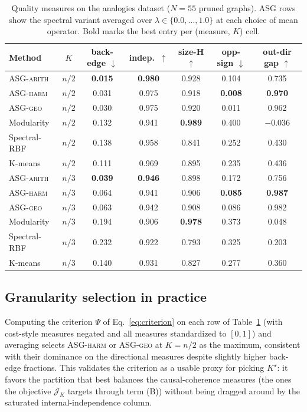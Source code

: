 \documentclass[table, 11pt]{article}
\begin{document}
\begin{table}[t]
\centering
\caption{Quality measures on the analogies dataset ($N=55$ pruned
graphs). ASG rows show the spectral variant averaged over
$\lambda \in \{0.0, \ldots, 1.0\}$ at each choice of mean operator.
Bold marks the best entry per (measure, $K$) cell.}
\label{tab:main}
\small
\begin{tabular}{@{}lcccccc@{}}
\toprule
\textbf{Method} & $K$ & back-edge $\downarrow$ & indep.\ $\uparrow$ & size-H $\uparrow$ & opp-sign $\downarrow$ & out-dir gap $\uparrow$ \\
\midrule
\textsc{ASG-arith} & $n/2$ & \textbf{0.015} & \textbf{0.980} & 0.928 & 0.104 & 0.735 \\
\textsc{ASG-harm}  & $n/2$ & 0.031 & 0.975 & 0.918 & \textbf{0.008} & \textbf{0.970} \\
\textsc{ASG-geo}   & $n/2$ & 0.030 & 0.975 & 0.920 & 0.011 & 0.962 \\
Modularity         & $n/2$ & 0.132 & 0.941 & \textbf{0.989} & 0.400 & $-0.036$ \\
Spectral-RBF       & $n/2$ & 0.138 & 0.958 & 0.841 & 0.252 & 0.430 \\
K-means            & $n/2$ & 0.111 & 0.969 & 0.895 & 0.235 & 0.436 \\
\midrule
\textsc{ASG-arith} & $n/3$ & \textbf{0.039} & \textbf{0.946} & 0.898 & 0.172 & 0.756 \\
\textsc{ASG-harm}  & $n/3$ & 0.064 & 0.941 & 0.906 & \textbf{0.085} & \textbf{0.987} \\
\textsc{ASG-geo}   & $n/3$ & 0.063 & 0.942 & 0.908 & 0.086 & 0.982 \\
Modularity         & $n/3$ & 0.194 & 0.906 & \textbf{0.978} & 0.373 & 0.048 \\
Spectral-RBF       & $n/3$ & 0.232 & 0.922 & 0.793 & 0.325 & 0.203 \\
K-means            & $n/3$ & 0.140 & 0.931 & 0.827 & 0.277 & 0.360 \\
\bottomrule
\end{tabular}
\end{table}

\subsection{Granularity selection in practice}

Computing the criterion $\Psi$ of Eq.~\eqref{eq:criterion} on each
row of Table~\ref{tab:main} (with cost-style measures negated and all
measures standardized to $[0,1]$) and averaging selects
\textsc{ASG-harm} or \textsc{ASG-geo} at $K=n/2$ as the maximum,
consistent with their dominance on the directional measures despite
slightly higher back-edge fractions. This validates the criterion as
a usable proxy for picking $K^\star$: it favors the partition that
best balances the causal-coherence measures (the ones the objective
$\mathcal{J}_K$ targets through term (B)) without being dragged
around by the saturated internal-independence column.
\end{document}
